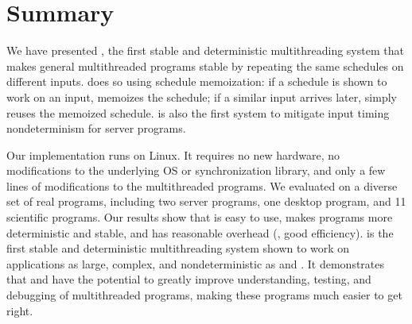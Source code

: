 \section{Summary}
\label{sec:tern-summary}

We have presented \tern, the first stable and deterministic multithreading 
system that makes general multithreaded programs stable by repeating the same 
schedules on different inputs.  \tern does so using schedule memoization: if a 
schedule is shown to work on an input, \tern memoizes the schedule; if a 
similar input arrives later, \tern simply reuses the memoized schedule. \tern 
is also the first \dmt system to mitigate input timing nondeterminism for server
programs.

Our \tern implementation runs on Linux.  It requires no new hardware, no
modifications to the underlying OS or synchronization library, and only a
few lines of modifications to the multithreaded programs.  We evaluated
\tern on a diverse set of real programs, including two server programs, one
desktop program, and 11 scientific programs.  Our results show that
\tern is easy to use, makes programs more deterministic and stable, and has
reasonable overhead (\ie, good efficiency).  \tern is the first stable and 
deterministic multithreading system shown to work on applications as large, 
complex, and nondeterministic as \mysql and \apache. It demonstrates that \smt 
and \dmt have the potential to greatly improve understanding, testing, and 
debugging of multithreaded programs, making these programs much easier to get 
right.

